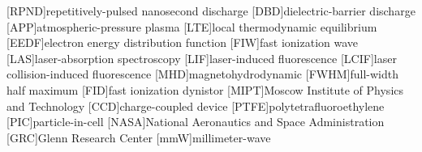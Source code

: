 [RPND]{repetitively-pulsed nanosecond discharge}
[DBD]{dielectric-barrier discharge}
[APP]{atmospheric-pressure plasma}
[LTE]{local thermodynamic equilibrium}
[EEDF]{electron energy distribution function}
[FIW]{fast ionization wave}
[LAS]{laser-absorption spectroscopy}
[LIF]{laser-induced fluorescence}
[LCIF]{laser collision-induced fluorescence}
[MHD]{magnetohydrodynamic}
[FWHM]{full-width half maximum}
[FID]{fast ionization dynistor}
[MIPT]{Moscow Institute of Physics and Technology}
[CCD]{charge-coupled device}
[PTFE]{polytetrafluoroethylene}
[PIC]{particle-in-cell}
[NASA]{National Aeronautics and Space Administration}
[GRC]{Glenn Research Center}
[mmW]{millimeter-wave}
